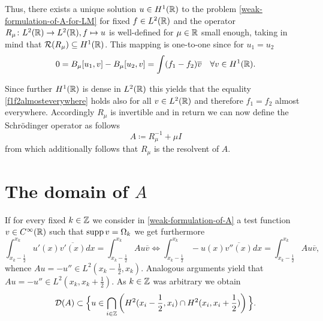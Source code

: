 Thus, there exists a unique solution $u \in H^{1}(\mathbb{R})$ to the problem \eqref{weak-formulation-of-A-for-LM} for fixed $f \in L^{2}(\mathbb{R})$ and  the operator $R_{\mu} \colon L^{2}(\mathbb{R}) \rightarrow L^{2}(\mathbb{R}), f \mapsto u$ is well-defined for $\mu \in \mathbb{R}$ small enough, taking in mind that $\mathcal{R}(R_{\mu}) \subseteq H^{1}(\mathbb{R})$. This mapping is one-to-one since for $u_{1} = u_{2}$
	\begin{equation}
		0 = B_{\mu}[u_{1}, v] - B_{\mu}[u_{2}, v]= \int (f_{1} - f_{2}) \overline{v} \quad \forall v \in H^{1}(\mathbb{R}). \label{f1f2almosteverywhere}
	\end{equation} 
	
Since further $H^{1}(\mathbb{R})$ is dense in $L^{2}(\mathbb{R})$ this yields that the equality \eqref{f1f2almosteverywhere} holds also for all $v \in L^{2}(\mathbb{R})$ and therefore $f_{1} = f_{2}$ almost everywhere. Accordingly $R_{\mu}$ is invertible and in return we can now define the Schrödinger operator as follows 
		\[ A \coloneqq R_{\mu}^{-1} + \mu I \]
from which additionally follows that $R_{\mu}$ is the resolvent of $A$.

\section{\texorpdfstring{The domain of $A$}{The Domain of A}}
If for every fixed $k \in \mathbb{Z}$ we consider in \eqref{weak-formulation-of-A} a test function $v \in C^{\infty}(\mathbb{R})$ such that $\operatorname{supp} v = \Omega_{k}$ we get furthermore
	\[ \int_{x_{k}-\frac{1}{2}}^{x_{k}} u'(x) \overline{v'(x)} dx = \int_{x_{k}-\frac{1}{2}}^{x_{k}} A u \overline{v} \iff \int_{x_{k}-\frac{1}{2}}^{x_{k}} - u(x) \overline{v''(x)} dx = \int_{x_{k}-\frac{1}{2}}^{x_{k}} A u \overline{v}, \]
whence $A u = - u'' \in L^{2}(x_{k} -\frac{1}{2}, x_{k})$. Analogous arguments yield that $A u = - u'' \in L^{2}(x_{k}, x_{k} + \frac{1}{2})$. As $k \in \mathbb{Z}$ was arbitrary we obtain
	$$ \mathcal{D}(A) \subset \Big\{ u \in \bigcap_{i \in \mathbb{Z}} \left( H^{2}(x_{i}-\frac{1}{2}, x_{i}) \cap H^{2}(x_{i}, x_{i} + \frac{1}{2}) \right) \Big\}. $$
	
